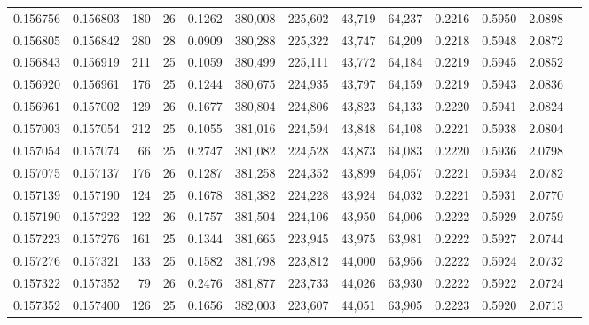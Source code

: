 \begin{tabular}{rrrrrrrrrrrrr}
0.156756 & 0.156803 & 180 &  26 &                                     0.1262 & 380,008 & 225,602 &  43,719 &  64,237 & 0.2216 & 0.5950 & 2.0898 \\
0.156805 & 0.156842 & 280 &  28 &                                     0.0909 & 380,288 & 225,322 &  43,747 &  64,209 & 0.2218 & 0.5948 & 2.0872 \\
0.156843 & 0.156919 & 211 &  25 &                                     0.1059 & 380,499 & 225,111 &  43,772 &  64,184 & 0.2219 & 0.5945 & 2.0852 \\
0.156920 & 0.156961 & 176 &  25 &                                     0.1244 & 380,675 & 224,935 &  43,797 &  64,159 & 0.2219 & 0.5943 & 2.0836 \\
0.156961 & 0.157002 & 129 &  26 &                                     0.1677 & 380,804 & 224,806 &  43,823 &  64,133 & 0.2220 & 0.5941 & 2.0824 \\
0.157003 & 0.157054 & 212 &  25 &                                     0.1055 & 381,016 & 224,594 &  43,848 &  64,108 & 0.2221 & 0.5938 & 2.0804 \\
0.157054 & 0.157074 &  66 &  25 &                                     0.2747 & 381,082 & 224,528 &  43,873 &  64,083 & 0.2220 & 0.5936 & 2.0798 \\
0.157075 & 0.157137 & 176 &  26 &                                     0.1287 & 381,258 & 224,352 &  43,899 &  64,057 & 0.2221 & 0.5934 & 2.0782 \\
0.157139 & 0.157190 & 124 &  25 &                                     0.1678 & 381,382 & 224,228 &  43,924 &  64,032 & 0.2221 & 0.5931 & 2.0770 \\
0.157190 & 0.157222 & 122 &  26 &                                     0.1757 & 381,504 & 224,106 &  43,950 &  64,006 & 0.2222 & 0.5929 & 2.0759 \\
0.157223 & 0.157276 & 161 &  25 &                                     0.1344 & 381,665 & 223,945 &  43,975 &  63,981 & 0.2222 & 0.5927 & 2.0744 \\
0.157276 & 0.157321 & 133 &  25 &                                     0.1582 & 381,798 & 223,812 &  44,000 &  63,956 & 0.2222 & 0.5924 & 2.0732 \\
0.157322 & 0.157352 &  79 &  26 &                                     0.2476 & 381,877 & 223,733 &  44,026 &  63,930 & 0.2222 & 0.5922 & 2.0724 \\
0.157352 & 0.157400 & 126 &  25 &                                     0.1656 & 382,003 & 223,607 &  44,051 &  63,905 & 0.2223 & 0.5920 & 2.0713 \\

\end{tabular}
